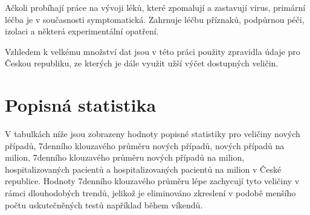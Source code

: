 \documentclass[a4paper, 12pt]{article}
\begin{document}
Ačkoli probíhají práce na vývoji léků, které zpomalují a zastavují virus, primární léčba je v současnosti symptomatická. Zahrnuje léčbu příznaků, podpůrnou péči, izolaci a některá experimentální opatření.

Vzhledem k velkému množství dat jsou v této práci použity zpravidla údaje pro
Českou republiku, ze kterých je dále využit užší výčet dostupných veličin.

\section{Popisná statistika}

V tabulkách níže jsou zobrazeny hodnoty popisné statistiky pro veličiny nových případů,
7denního klouzavého průměru nových případů, nových případů na milion, 7denního klouzavého průměru nových případů na milion,
hospitalizovaných pacientů a hospitalizovaných pacientů na milion v České republice. Hodnoty 7denního klouzavého průměru
lépe zachycují tyto veličiny v rámci dlouhodobých trendů, jelikož je eliminováno zkreslení v podobě menšího počtu uskutečněných
testů například během víkendů.
\end{document}
